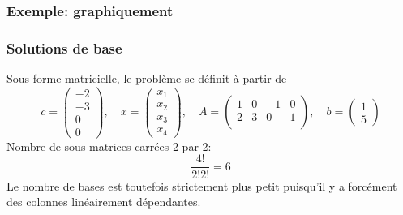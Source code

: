 \documentclass[usepdftitle=false]{beamer}
\begin{document}
\begin{frame}
\frametitle{Exemple: graphiquement}

\begin{center}
\end{center}

\end{frame}

\begin{frame}
\frametitle{Solutions de base}

Sous forme matricielle, le problème se définit à partir de
$$
c = \begin{pmatrix}
-2 \\ -3 \\ 0 \\ 0
\end{pmatrix}, \quad
x = \begin{pmatrix}
x_1 \\ x_2 \\ x_3 \\ x_4
\end{pmatrix},\quad
A = \begin{pmatrix}
1 & 0 & -1 & 0 \\
2 & 3 & 0 & 1 \\
\end{pmatrix},\quad
b = \begin{pmatrix}
1 \\ 5
\end{pmatrix}
$$
Nombre de sous-matrices carrées 2 par 2:
$$
\frac{4!}{2!2!} = 6
$$
Le nombre de bases est toutefois strictement plus petit puisqu'il y a forcément des colonnes linéairement dépendantes.

\end{frame}
\end{document}
